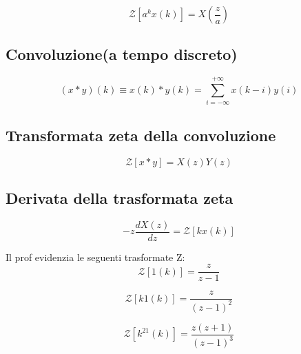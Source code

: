 \begin{equation}
  \mathcal{Z} [a^k x(k)] = X \left( \frac{z}{a} \right)
\end{equation}

\subsection{Convoluzione(a tempo discreto)}
\begin{equation}
  (x * y)(k) \equiv x(k) * y(k) = \sum_{i=-\infty}^{+\infty} x(k-i) y(i)
\end{equation}

\subsection{Transformata zeta della convoluzione}
\begin{equation}
  \mathcal{Z} [x * y] = X(z) Y(z)
\end{equation}

\subsection{Derivata della trasformata zeta}
\begin{equation}
  -z \frac{dX(z)}{dz} = \mathcal{Z} [k x(k)]
\end{equation}




Il prof evidenzia le seguenti trasformate Z:
\begin{equation}
  \mathcal{Z}[1(k)] = \frac{z}{z-1}
\end{equation}

\begin{equation}
  \mathcal{Z}[k1(k)] = \frac{z}{(z-1)^2}
\end{equation}

\begin{equation}
  \mathcal{Z}[k^21(k)] = \frac{z(z+1)}{(z-1)^3}
\end{equation}
